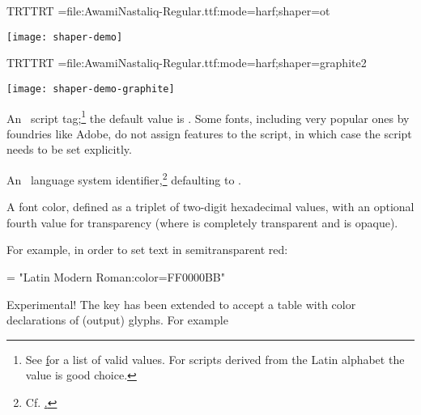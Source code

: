   \beginlisting
  \pardir TRT\textdir TRT
  \font\test={file:AwamiNastaliq-Regular.ttf:mode=harf;shaper=ot}
  \endlisting

  \texttt{[image: shaper-demo]}

  \beginlisting
  \pardir TRT\textdir TRT
  \font\test={file:AwamiNastaliq-Regular.ttf:mode=harf;shaper=graphite2}
  \endlisting

  \texttt{[image: shaper-demo-graphite]}

  \endaltitem
   \label{script-tag}
         An \OpenType\ script tag;\footnote{%
           See \hyperlink {http://www.microsoft.com/typography/otspec/scripttags.htm}
           for a list of valid values.
           For scripts derived from the Latin alphabet the value
            is good choice.
         }
         the default value is .
         Some fonts, including very popular ones by foundries like Adobe,
         do not assign features to the  script, in
         which case the script needs to be set explicitly.
  \endaltitem

         An \OpenType\ language system identifier,\footnote{%
           Cf. \hyperlink {http://www.microsoft.com/typography/otspec/languagetags.htm}.
         }
         defaulting to .
  \endaltitem

         A font color, defined as a triplet of two-digit hexadecimal
          values, with an optional fourth value for
         transparency
         (where  is completely transparent and
          is opaque).

         For example, in order to set text in semitransparent red:

         \beginlisting
      \font \test = "Latin Modern Roman:color=FF0000BB"
         \endlisting

         Experimental!\label{color-glyphs} The  key has been
         extended to accept a table with color declarations of (output) glyphs. For example

         \beginlisting
          \endlisting

